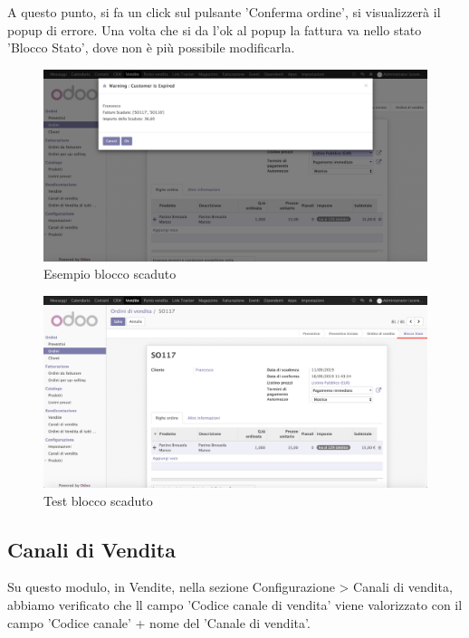 A questo punto, si fa un click sul pulsante 'Conferma ordine', si visualizzerà il popup di errore.
Una volta che si da l'ok al popup la fattura va nello stato\\ 'Blocco Stato', dove non è più possibile modificarla.
\begin{figure}[H]
	\begin{center} \includegraphics[scale=0.3]{figures/expired_es}
		\caption[Esempio blocco scaduto]{Esempio blocco scaduto}
		\label{fig:expired_es}
	\end{center}
\end{figure}

\begin{figure}[H]
	\begin{center} \includegraphics[scale=0.3]{figures/test_expired}
		\caption[Test blocco scaduto]{Test blocco scaduto}
		\label{fig:third_test}
	\end{center}
\end{figure}
\newpage
\subsection{Canali di Vendita}

Su questo modulo, in Vendite, nella sezione Configurazione > Canali di vendita, abbiamo verificato che ll campo 'Codice canale di vendita' viene valorizzato con il campo 'Codice canale' + nome del 'Canale di vendita'.

